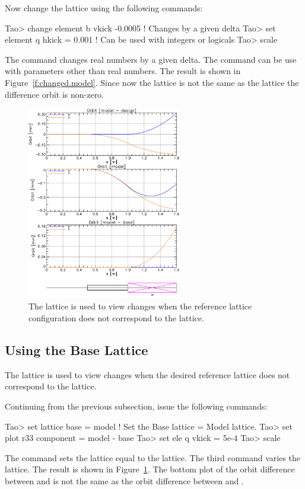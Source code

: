 \documentclass{hitec}
\begin{document}
Now change the  lattice using the following commands:
\begin{code}
Tao> change element b vkick  -0.0005   ! Changes by a given delta
Tao> set element q hkick = 0.001       ! Can be used with integers or logicals
Tao> scale
\end{code}
The  command changes real numbers by a given delta. The  command can be use with
parameters other than real numbers.  The result is shown in Figure~\ref{f:changed.model}. Since now
the  lattice is not the same as the  lattice the difference orbit is non-zero.

\begin{figure}[b]
  \centering
  \includegraphics[width=0.6\textwidth]{with-base.pdf}
  \caption{The  lattice is used to view changes when the reference lattice configuration
does not correspond to the  lattice.}
  \label{f:base}
\end{figure}

\subsection{Using the Base Lattice}

The  lattice is used to view changes when the desired reference lattice does not
correspond to the  lattice.

Continuing from the previous subsection, issue the following commands:
\begin{code}
Tao> set lattice base = model  ! Set the Base lattice = Model lattice.
Tao> set plot r33 component = model - base
Tao> set ele q vkick = 5e-4
Tao> scale
\end{code} 
The  command sets the  lattice equal to the 
lattice. The third command varies the  lattice.  The result is shown in
Figure~\ref{f:base}. The bottom plot of the orbit difference between  and
 is not the same as the orbit difference between  and .
\end{document}
